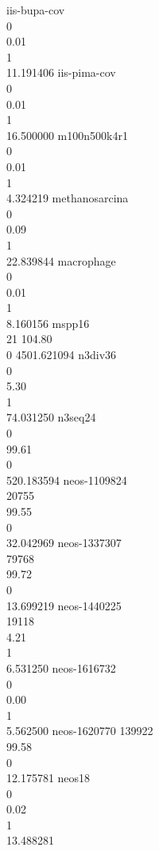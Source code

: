 iis-bupa-cov \\ 0 \\ 0.01 \\ 1 \\ 11.191406
iis-pima-cov \\ 0 \\ 0.01 \\ 1 \\ 16.500000
m100n500k4r1 \\ 0 \\ 0.01 \\ 1 \\ 4.324219
methanosarcina \\ 0 \\ 0.09 \\ 1 \\ 22.839844
macrophage \\ 0 \\ 0.01 \\ 1 \\ 8.160156
mspp16 \\ 21 104.80 \\ 0 4501.621094
n3div36 \\ 0 \\ 5.30 \\ 1 \\ 74.031250
n3seq24 \\ 0 \\ 99.61 \\ 0 \\ 520.183594
neos-1109824 \\ 20755 \\ 99.55 \\ 0 \\ 32.042969
neos-1337307 \\ 79768 \\ 99.72 \\ 0 \\ 13.699219
neos-1440225 \\ 19118 \\ 4.21 \\ 1 \\ 6.531250
neos-1616732 \\ 0 \\ 0.00 \\ 1 \\ 5.562500
neos-1620770 139922 \\ 99.58 \\ 0 \\ 12.175781
neos18 \\ 0 \\ 0.02 \\ 1 \\ 13.488281
